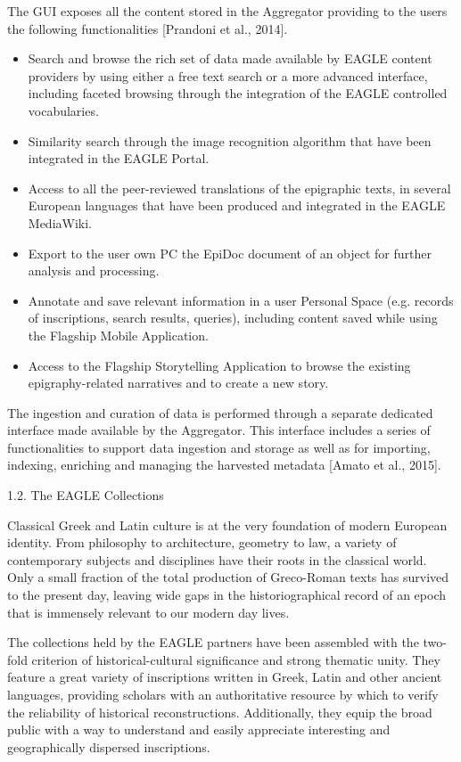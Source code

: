 The GUI exposes all the content stored in the Aggregator providing to the users the following functionalities [Prandoni
et al., 2014].

\begin{itemize}
\item Search and browse the rich set of data made available by EAGLE content providers by using either a free text
search or a more advanced interface, including faceted browsing through the integration of the EAGLE controlled
vocabularies.
\item Similarity search through the image recognition algorithm that have been integrated in the EAGLE Portal.
\item Access to all the peer-reviewed translations of the epigraphic texts, in several European languages that have been
produced and integrated in the EAGLE MediaWiki.
\item Export to the user own PC the EpiDoc document of an object for further analysis and processing.
\item Annotate and save relevant information in a user Personal Space (e.g. records of inscriptions, search results,
queries), including content saved while using the Flagship Mobile Application.
\item Access to the Flagship Storytelling Application to browse the existing epigraphy-related narratives and to create
a new story.
\end{itemize}
The ingestion and curation of data is performed through a separate dedicated interface made available by the Aggregator.
This interface includes a series of functionalities to support data ingestion and storage as well as for importing,
indexing, enriching and managing the harvested metadata [Amato et al., 2015].

1.2. The EAGLE Collections

Classical Greek and Latin culture is at the very foundation of modern European identity. From philosophy to
architecture, geometry to law, a variety of contemporary subjects and disciplines have their roots in the classical
world. Only a small fraction of the total production of Greco-Roman texts has survived to the present day, leaving wide
gaps in the historiographical record of an epoch that is immensely relevant to our modern day lives. 

The collections held by the EAGLE partners have been assembled with the two-fold criterion of historical-cultural
significance and strong thematic unity. They feature a great variety of inscriptions written in Greek, Latin and other
ancient languages, providing scholars with an authoritative resource by which to verify the reliability of historical
reconstructions. Additionally, they equip the broad public with a way to understand and easily appreciate interesting
and geographically dispersed inscriptions.

